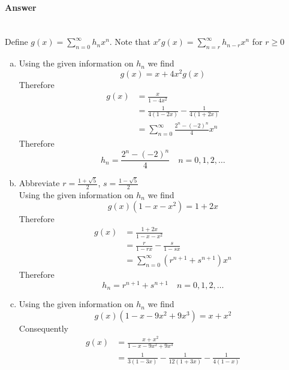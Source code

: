 \documentclass[UTF8]{article}
\begin{document}
\paragraph{Answer}
~\\
Define $ g(x) = \sum_{n = 0}^{\infty}h_{n}x^{n} $. Note that $ x^{r}g(x) = \sum_{n = r}^{\infty}h_{n - r}x^{n} $ for $ r \geq 0 $
\begin{enumerate}[(a)]
    \item Using the given information on $ h_{n} $ we find
          $$ g(x)  = x + 4x^{2}g(x) $$
          Therefore
          \begin{equation}
          \begin{aligned}
          g(x) &= \frac{x}{1 - 4x^{2}} \\
          &= \frac{1}{4(1 - 2x)} - \frac{1}{4(1 + 2x)} \\
          &= \sum_{n = 0}^\infty \frac{2^{n} - {(-2)}^{n}}{4} x^{n}
          \nonumber
          \end{aligned}
          \end{equation}
          Therefore
          $$ h_{n} = \frac{2^{n} - {(-2)}^{n}}{4} \quad n=0,1,2, \dots $$
    \item Abbreviate $ r = \frac{1 + \sqrt{5}}{2} $, \quad $ s = \frac{1 - \sqrt{5}}{2} $ \\
          Using the given information on $ h_{n} $ we find
          $$ g(x)(1 - x - x^2)  = 1 + 2x $$
          Therefore
          \begin{equation}
          \begin{aligned}
          g(x) &= \frac{1 + 2x}{1 - x - x^2} \\
          &= \frac{r}{1 - rx} - \frac{s}{1 - sx} \\
          &= \sum_{n = 0}^\infty (r^{n + 1} + s^{n + 1}) x^{n}
          \nonumber
          \end{aligned}
          \end{equation}
          Therefore
          $$ h_{n} = r^{n + 1} + s^{n + 1} \quad n=0,1,2, \dots $$
    \item Using the given information on $ h_{n} $ we find
          $$ g(x)(1 -x - 9x^2 + 9x^3)  = x + x^2 $$
          Consequently
          \begin{equation}
          \begin{aligned}
          g(x) &= \frac{x + x^2}{1 -x - 9x^2 + 9x^3} \\
          &= \frac{1}{3(1 - 3x)} - \frac{1}{12(1 + 3x)} - \frac{1}{4(1 - x)} \\

\end{aligned}
\end{equation}
\end{enumerate}
\end{document}
